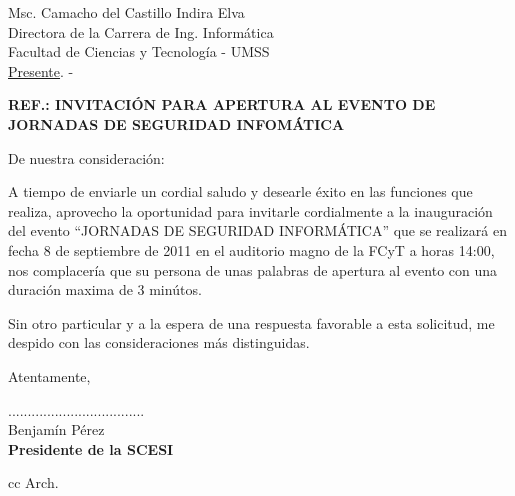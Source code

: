 \documentclass[letterpaper,12pt]{letter}
\begin{document}
\date {6 de septiembre de 2011}
\begin{letter}{Msc. Camacho del Castillo Indira Elva \\ Directora de la Carrera de Ing. Inform\'atica \\ Facultad de Ciencias y Tecnolog\'ia - UMSS \\ \underline {Presente}. -}

\begin{center}
	\opening{\textbf{REF.: INVITACI\'ON PARA APERTURA AL EVENTO DE JORNADAS DE SEGURIDAD INFOM\'ATICA}}
\end{center}

De nuestra consideración:

A tiempo de enviarle un cordial saludo y desearle éxito en las funciones que realiza, aprovecho la oportunidad para invitarle 
cordialmente a la inauguraci\'on del evento ``JORNADAS DE SEGURIDAD INFORMÁTICA'' que se realizar\'a en fecha 8 de septiembre 
de 2011 en el auditorio magno de la FCyT a horas 14:00, nos complacer\'ia que su persona de unas palabras de apertura al evento 
con una duraci\'on maxima de 3 min\'utos.
             
Sin otro particular y a la espera de una respuesta favorable a esta solicitud, me despido con las consideraciones más distinguidas.

Atentamente,

\vspace{5cm}

\begin{center}
...................................\\
Benjam\'in P\'erez\\
{\bfseries Presidente de la  SCESI}
\end{center}
\vspace{2cm}
cc Arch.
\end{letter}
\end{document}
